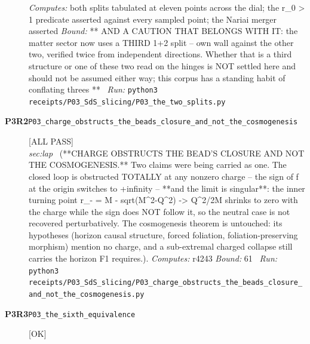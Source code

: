 \begin{description}
\emph{Computes:} both splits tabulated at eleven points across the dial; the \textbar{}r\_0\textbar{} > 1 predicate asserted against every sampled point; the Nariai merger asserted
 \emph{Bound:} ** AND A CAUTION THAT BELONGS WITH IT: the matter sector now uses a THIRD 1+2 split -- own wall against the other two, verified twice from independent directions. Whether that is a third structure or one of these two read on the hinges is NOT settled here and should not be assumed either way; this corpus has a standing habit of conflating threes **
\ \emph{Run:} \texttt{python3 receipts/P03\_SdS\_slicing/P03\_the\_two\_splits.py}
\item[\rcptlabel{P03_charge_obstructs_the_beads_closure_and_not_the_cosmogenesis}{P3R2}\textbf{P3R2}\quad\texttt{P03\_charge\_obstructs\_the\_beads\_closure\_and\_not\_the\_cosmogenesis}]\hfill\textsf{[ALL PASS]}\\
\textit{sec:lap} \ (**CHARGE OBSTRUCTS THE BEAD'S CLOSURE AND NOT THE COSMOGENESIS.** Two claims were being carried as one. The closed loop is obstructed TOTALLY at any nonzero charge -- the sign of f at the origin switches to +infinity -- **and the limit is singular**: the inner turning point r\_- = M - sqrt(M\textasciicircum{}2-Q\textasciicircum{}2) -> Q\textasciicircum{}2/2M shrinks to zero with the charge while the sign does NOT follow it, so the neutral case is not recovered perturbatively. The cosmogenesis theorem is untouched: its hypotheses (horizon causal structure, forced foliation, foliation-preserving morphism) mention no charge, and a sub-extremal charged collapse still carries the horizon F1 requires.). 
\emph{Computes:} r4243
 \emph{Bound:} 61
\ \emph{Run:} \texttt{python3 receipts/P03\_SdS\_slicing/P03\_charge\_obstructs\_the\_beads\_closure\_and\_not\_the\_cosmogenesis.py}
\item[\rcptlabel{P03_the_sixth_equivalence}{P3R3}\textbf{P3R3}\quad\texttt{P03\_the\_sixth\_equivalence}]\hfill\textsf{[OK]}\\

\end{description}
